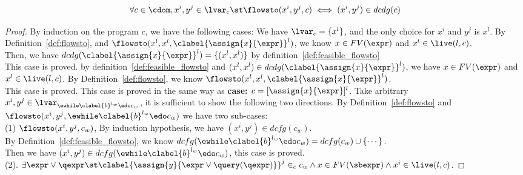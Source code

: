 \begin{thm}
    \label{thm:rd_soundness}
    \[
    \forall c \in \cdom, x^i, y^j \in \lvar_c \st 
    \flowsto(x^i, y^j, c) \iff (x^i, y^j) \in dcdg(c)
    \]
    \end{thm}
\begin{proof}
    \label{pf:rd_soundness}
        By induction on the program $c$, we have the following cases:
        We have $\lvar_c = \{x^l\}$, and the only choice for $x^i$ and $y^j$ is $x^l$.
        \subcaseL{$\implies$}
        By Definition~\ref{def:flowsto}, and $\flowsto(x^l, x^l, \clabel{\assign{x}{\expr}}^l)$, we know $x \in FV(\expr)$ and $x^l \in \live(l, c)$.
        \\
        Then, we have $dcdg(\clabel{\assign{x}{\expr}}^l) = \{(x^l, x^l)\}$ by definition~\ref{def:feasible_flowsto}
        \\
        This case is proved.
        \subcaseL{$\Longleftarrow$}
        by definition~\ref{def:feasible_flowsto} and $(x^l, x^l) \in dcdg(\clabel{\assign{x}{\expr}}^l)$, we have 
        $x \in FV(\expr)$ and $x^l \in \live(l, c)$.
        By Definition~\ref{def:flowsto}, we know $\flowsto(x^l, x^l, \clabel{\assign{x}{\expr}}^l)$.
        \\
        This case is proved.
        This case is proved in the same way as \textbf{case: $c = [\assign{x}{\expr}]^l$}.
        Take arbitrary $x^i, y^j \in \lvar_{\ewhile \clabel{b}^{l_w} \edo c_w}$, it is sufficient to show the following two directions.
        \subcaseL{$\implies$}
        By Definition~\ref{def:flowsto} and $\flowsto(x^i, y^j, \ewhile \clabel{b}^{l_w} \edo c_w)$ we have two sub-cases:
        \\
        (1) $\flowsto(x^i, y^j, c_w)$,
        By induction hypothesis, we have $(x^i, y^j) \in dcfg(c_w)$.
        \\
        By Definition~\ref{def:feasible_flowsto}, we know $dcfg(\ewhile \clabel{b}^{l_w} \edo c_w) = dcfg(c_w) \cup \{\cdots\}$.
        \\
        Then we have $(x^i, y^j) \in dcfg(\ewhile \clabel{b}^{l_w} \edo c_w)$, this case is proved.
        \\
        (2). $\exists \expr \lor \qexpr \st	\clabel{\assign{y}{\expr \lor \query(\qexpr)}}^{j} \in_{c}  {c_w}  
        \land {x} \in FV(\sbexpr) \land x^i \in \live(l, c)$.

\end{proof}
